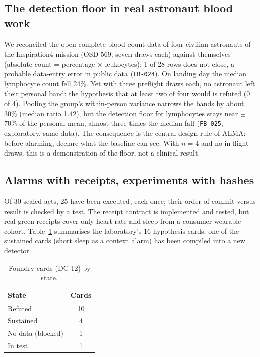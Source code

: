 \documentclass[conference]{IEEEtran}
\newcommand{\act}[1]{\texttt{FB-#1}}
\begin{document}
\subsection{The detection floor in real astronaut blood work}
We reconciled the open complete-blood-count data of four civilian astronauts of the Inspiration4 mission (OSD-569; seven draws each) against themselves (absolute count = percentage $\times$ leukocytes): 1 of 28 rows does not close, a probable data-entry error in public data (\act{024}). On landing day the median lymphocyte count fell 24\%. Yet with three preflight draws each, no astronaut left their personal band: the hypothesis that at least two of four would is refuted (0 of 4). Pooling the group's within-person variance narrows the bands by about 30\% (median ratio 1.42), but the detection floor for lymphocytes stays near $\pm$70\% of the personal mean, almost three times the median fall (\act{025}, exploratory, same data). The consequence is the central design rule of ALMA: before alarming, declare what the baseline can see. With $n=4$ and no in-flight draws, this is a demonstration of the floor, not a clinical result.

\subsection{Alarms with receipts, experiments with hashes}
Of 30 sealed acts, 25 have been executed, each once; their order of commit versus result is checked by a test. The receipt contract is implemented and tested, but real green receipts cover only heart rate and sleep from a consumer wearable cohort. Table~\ref{tab:cards} summarises the laboratory's 16 hypothesis cards; one of the sustained cards (short sleep as a context alarm) has been compiled into a new detector.

\begin{table}[t]
\centering\caption{Foundry cards (DC-12) by state.}\label{tab:cards}
\begin{tabular}{|l|c|}
\hline
State & Cards\\ \hline
Refuted & 10\\ \hline
Sustained & 4\\ \hline
No data (blocked) & 1\\ \hline
In test & 1\\ \hline
\end{tabular}
\end{table}
\end{document}
